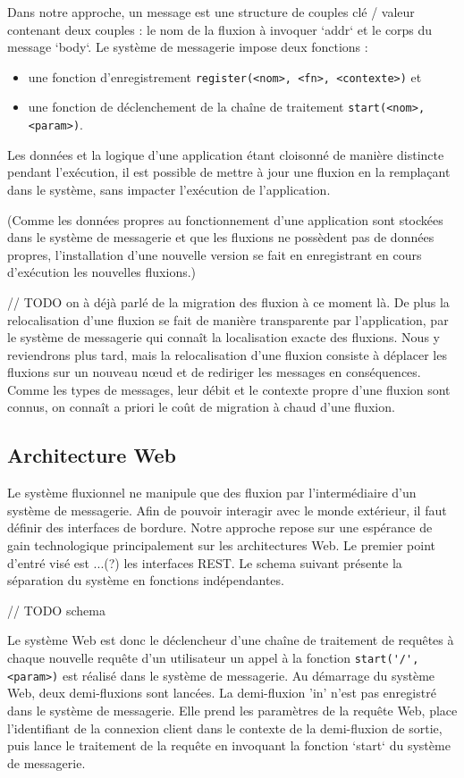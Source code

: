 		Dans notre approche, un message est une structure de couples clé / valeur  contenant deux couples : le nom de la fluxion à invoquer `addr` et le corps du message `body`.
		Le système de messagerie impose deux fonctions :
		\begin{itemize}
			\item une fonction d'enregistrement
		    \lstinline|register(<nom>, <fn>, <contexte>)| et
			\item une fonction de déclenchement de la chaîne de traitement
		    \lstinline|start(<nom>,<param>)|.
		\end{itemize}


		Les données et la logique d'une application étant cloisonné de manière distincte pendant l'exécution, il est possible de mettre à jour une fluxion en la remplaçant dans le système, sans impacter l'exécution de l'application.

		(Comme les données propres au fonctionnement d'une application sont stockées dans le système de messagerie et que les fluxions ne possèdent pas de données propres, l'installation d'une nouvelle version se fait en enregistrant en cours d'exécution les nouvelles fluxions.)


		// TODO on à déjà parlé de la migration des fluxion à ce moment là.
		De plus la relocalisation d'une fluxion se fait de manière transparente par l'application, par le système de messagerie qui connaît la localisation exacte des fluxions. Nous y reviendrons plus tard, mais la relocalisation d'une fluxion consiste à déplacer les fluxions sur un nouveau nœud et de rediriger les messages en conséquences. Comme les types de messages, leur débit et le contexte propre d'une fluxion sont connus, on connaît a priori le coût de migration à chaud d'une fluxion.

	\subsection{Architecture Web}

		Le système fluxionnel ne manipule que des fluxion par l'intermédiaire d'un système de messagerie. Afin de pouvoir interagir avec le monde extérieur, il faut définir des interfaces de bordure. Notre approche repose sur une espérance de gain technologique principalement sur les architectures Web. Le premier point d'entré visé est ...(?) les interfaces REST.
		Le schema suivant présente la séparation du système en fonctions indépendantes.

		// TODO schema

		Le système Web est donc le déclencheur d'une chaîne de traitement de requêtes à chaque nouvelle requête d'un utilisateur un appel à la fonction \lstinline|start('/', <param>)| est réalisé dans le système de messagerie.
		Au démarrage du système Web, deux demi-fluxions sont lancées.
		La demi-fluxion 'in' n'est pas enregistré dans le système de messagerie.
		Elle prend les paramètres de la requête Web, place l'identifiant de la connexion client dans le contexte de la demi-fluxion de sortie, puis lance le traitement de la requête en invoquant la fonction `start` du système de messagerie.